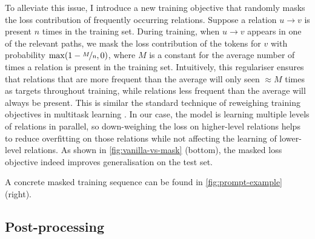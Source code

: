 To alleviate this issue, I introduce a new training objective that randomly masks the loss contribution of frequently occurring relations. Suppose a relation $u \to v$ is present $n$ times in the training set. During training, when $u \to v$ appears in one of the relevant paths, we mask the loss contribution of the tokens for $v$ with probability $\max(1 - \nicefrac{M}{n}, 0)$, where $M$ is a constant for the average number of times a relation is present in the training set. Intuitively, this regulariser ensures that relations that are more frequent than the average will only seen $\approx\!M$ times as targets throughout training, while relations less frequent than the average will always be present. This is similar the standard technique of reweighing training objectives in multitask learning \cite{caruana1997multitask}. In our case, the model is learning multiple levels of relations in parallel, so down-weighing the loss on higher-level relations helps to reduce overfitting on those relations while not affecting the learning of lower-level relations. As shown in \cref{fig:vanilla-vs-mask} (bottom), the masked loss objective indeed improves generalisation on the test set.

A concrete masked training sequence can be found in \cref{fig:prompt-example} (right).

\subsection{Post-processing}  \label{sec:method:post-processing}

